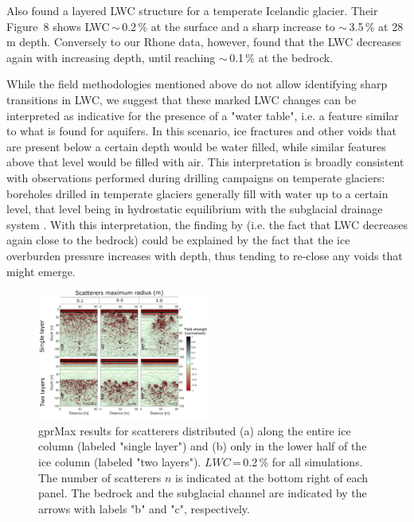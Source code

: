 Also \cite{Murray&al2000} found a layered LWC structure for a temperate Icelandic glacier. Their Figure~8 shows LWC\,$\sim$\,0.2\,\% at the surface and a sharp increase to $\sim$\,3.5\,\% at 28\,m depth. Conversely to our Rhone data, however, \cite{Murray&al2000} found that the LWC decreases again with increasing depth, until reaching $\sim$\,0.1\,\% at the bedrock.

While the field methodologies mentioned above do not allow identifying  sharp transitions in LWC, we suggest that these marked LWC changes can be interpreted as indicative for the presence of a "water table", i.e. a feature similar to what is found for aquifers. In this scenario, ice fractures and other voids that are present below a certain depth would be water filled, while similar features above that level would be filled with air. This interpretation is broadly consistent with observations performed during drilling campaigns on temperate glaciers: boreholes drilled in temperate glaciers generally fill with water up to a certain level, that level being in hydrostatic equilibrium with the subglacial drainage system \citep[e.g][]{Iken&al1996,pohle&&2022}. With this interpretation, the finding by \cite{Murray&al2000} (i.e. the fact that LWC decreases again close to the bedrock) could be explained by the fact that the ice overburden pressure increases with depth, thus tending to re-close any voids that might emerge.

\begin{figure}
    \centering
    \includegraphics[width=0.5\textwidth]{chapters/chapter_gprmax/Fig07.pdf}
    \caption{gprMax results for scatterers distributed (a) along the entire ice column (labeled "single layer") and (b) only in the lower half of the ice column (labeled "two layers"). $LWC$\,=\,0.2\,\% for all simulations. The number of scatterers $n$ is indicated at the bottom right of each panel. The bedrock and the subglacial channel are indicated by the arrows with labels "b" and "c", respectively.}
    \label{fig:sensitivity_bilayer}
\end{figure}


